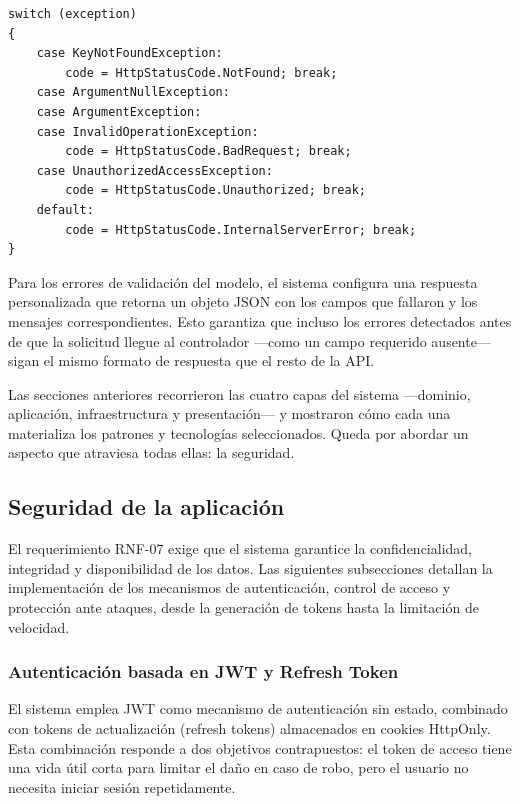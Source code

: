 \begin{lstlisting}[language={[Sharp]C}, caption={Mapeo de excepciones a códigos HTTP}, label={lst:error_mapping}]
switch (exception)
{
    case KeyNotFoundException:
        code = HttpStatusCode.NotFound; break;
    case ArgumentNullException:
    case ArgumentException:
    case InvalidOperationException:
        code = HttpStatusCode.BadRequest; break;
    case UnauthorizedAccessException:
        code = HttpStatusCode.Unauthorized; break;
    default:
        code = HttpStatusCode.InternalServerError; break;
}
\end{lstlisting}

Para los errores de validación del modelo, el sistema configura una respuesta personalizada que retorna un objeto JSON con los campos que fallaron y los mensajes correspondientes. Esto garantiza que incluso los errores detectados antes de que la solicitud llegue al controlador —como un campo requerido ausente— sigan el mismo formato de respuesta que el resto de la API.

Las secciones anteriores recorrieron las cuatro capas del sistema —dominio, aplicación, infraestructura y presentación— y mostraron cómo cada una materializa los patrones y tecnologías seleccionados. Queda por abordar un aspecto que atraviesa todas ellas: la seguridad.

\subsection{Seguridad de la aplicación}
\label{section:seguridad}

El requerimiento RNF-07 exige que el sistema garantice la confidencialidad, integridad y disponibilidad de los datos. 
Las siguientes subsecciones detallan la implementación de los mecanismos de autenticación, control de acceso y protección ante ataques, desde la generación de tokens hasta la limitación de velocidad.

\subsubsection{Autenticación basada en JWT y Refresh Token}

El sistema emplea \gls{JWT} como mecanismo de autenticación sin estado, combinado con tokens de actualización (refresh tokens) almacenados en cookies HttpOnly. Esta combinación responde a dos objetivos contrapuestos: el token de acceso tiene una vida útil corta para limitar el daño en caso de robo, pero el usuario no necesita iniciar sesión repetidamente.

